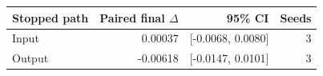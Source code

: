 \begin{tabular}{lrrr}
\toprule
Stopped path & Paired final $\Delta$ & 95\% CI & Seeds \\
\midrule
Input & 0.00037 & [-0.0068, 0.0080] & 3 \\
Output & -0.00618 & [-0.0147, 0.0101] & 3 \\
\bottomrule
\end{tabular}

